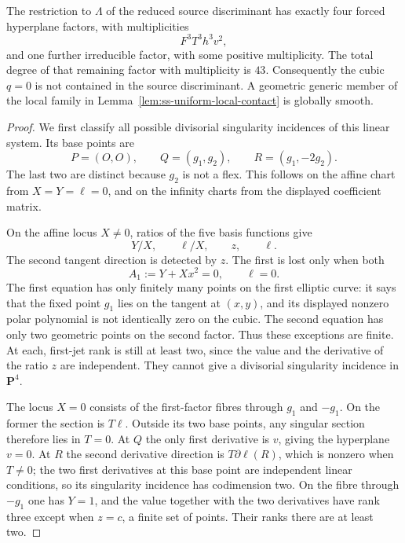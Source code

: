 \begin{lemma}
\label{lem:ss-uniform-source-smoothness}
The restriction to $\Lambda$ of the reduced source discriminant has
exactly four forced hyperplane factors, with multiplicities
\[
                            F^3T^3h^3v^2,
\]
and one further irreducible factor, with some positive multiplicity.
The total degree of that remaining factor with multiplicity is $43$.
Consequently the cubic $q=0$ is not contained in the source
discriminant. A geometric generic member of the local family in
Lemma~\ref{lem:ss-uniform-local-contact} is globally smooth.
\end{lemma}
\begin{proof}
We first classify all possible divisorial singularity incidences of
this linear system. Its base points are
\[
              P=(O,O),\qquad Q=(g_1,g_2),
                    \qquad R=(g_1,-2g_2).
\]
The last two are distinct because $g_2$ is not a flex. This follows
on the affine chart from $X=Y=\ell=0$, and on the infinity charts
from the displayed coefficient matrix.

On the affine locus $X\ne0$, ratios of the five basis functions give
\[
                 Y/X,\qquad\ell/X,\qquad z,\qquad\ell.
\]
The second tangent direction is detected by $z$. The first is lost
only when both
\[
                    A_1:=Y+Xx^2=0,\qquad\ell=0.
\]
The first equation has only finitely many points on the first elliptic
curve: it says that the fixed point $g_1$ lies on the tangent at
$(x,y)$, and its displayed nonzero polar polynomial is not identically
zero on the cubic. The second equation has only two geometric points
on the second factor. Thus these exceptions are finite. At each,
first-jet rank is still at least two, since the value and the derivative
of the ratio $z$ are independent. They cannot give a divisorial
singularity incidence in $\mathbf P^4$.

The locus $X=0$ consists of the first-factor fibres through $g_1$
and $-g_1$. On the former the section is $T\ell$. Outside its two
base points, any singular section therefore lies in $T=0$.
At $Q$ the only first derivative is $v$, giving the hyperplane $v=0$.
At $R$ the second derivative direction is $T\partial\ell(R)$,
which is nonzero when $T\ne0$; the two first derivatives at this
base point are independent linear conditions, so its singularity
incidence has codimension two. On the fibre through $-g_1$ one has
$Y=1$, and the value together with the two derivatives have rank
three except when $z=c$, a finite set of points. Their ranks there
are at least two.


\end{proof}
